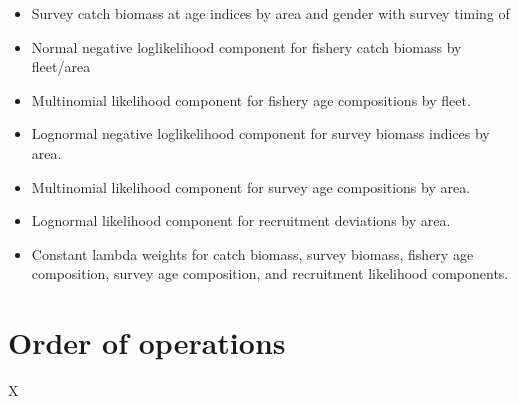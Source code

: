 \documentclass[12pt]{article}
\begin{document}
\begin{itemize}
	\item Survey catch biomass at age indices by area and gender with survey timing of
	
	\item Normal negative loglikelihood component for fishery catch biomass by fleet/area
	
	\item Multinomial likelihood component for fishery age compositions by fleet.
	
	\item Lognormal negative loglikelihood component for survey biomass indices by area.
	
	\item Multinomial likelihood component for survey age compositions by area.
	
	\item Lognormal likelihood component for recruitment deviations by area.
	
	\item Constant lambda weights for catch biomass, survey biomass, fishery age composition, survey age composition, and recruitment likelihood components.
	
\end{itemize}


\section{Order of operations}

X
\end{document}
